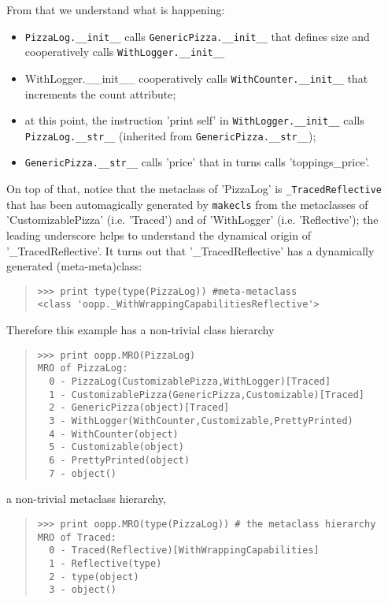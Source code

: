 \documentclass[10pt,english]{article}
\begin{document}
From that we understand what is happening:
\begin{itemize}
\item {} 
\texttt{PizzaLog.{\_}{\_}init{\_}{\_}} calls \texttt{GenericPizza.{\_}{\_}init{\_}{\_}} that defines size and
cooperatively calls \texttt{WithLogger.{\_}{\_}init{\_}{\_}}

\item {} 
WithLogger.{\_}{\_}init{\_}{\_} cooperatively calls \texttt{WithCounter.{\_}{\_}init{\_}{\_}} 
that increments the count attribute;

\item {} 
at this point, the instruction 'print self' in \texttt{WithLogger.{\_}{\_}init{\_}{\_}} calls 
\texttt{PizzaLog.{\_}{\_}str{\_}{\_}} (inherited from \texttt{GenericPizza.{\_}{\_}str{\_}{\_}});

\item {} 
\texttt{GenericPizza.{\_}{\_}str{\_}{\_}} calls 'price' that in turns calls 
'toppings{\_}price'.

\end{itemize}

On top of that, notice that the metaclass of 'PizzaLog' is
\texttt{{\_}TracedReflective} that has been automagically generated by 
\texttt{makecls} from the metaclasses of 'CustomizablePizza' (i.e. 'Traced')
and of 'WithLogger' (i.e. 'Reflective'); the leading underscore helps 
to understand the dynamical origin of '{\_}TracedReflective'.
It turns out that '{\_}TracedReflective' has a dynamically
generated (meta-meta)class:
\begin{quote}
\begin{verbatim}>>> print type(type(PizzaLog)) #meta-metaclass
<class 'oopp._WithWrappingCapabilitiesReflective'>\end{verbatim}
\end{quote}

Therefore this example has a non-trivial class hierarchy
\begin{quote}
\begin{verbatim}>>> print oopp.MRO(PizzaLog)
MRO of PizzaLog:
  0 - PizzaLog(CustomizablePizza,WithLogger)[Traced]
  1 - CustomizablePizza(GenericPizza,Customizable)[Traced]
  2 - GenericPizza(object)[Traced]
  3 - WithLogger(WithCounter,Customizable,PrettyPrinted)
  4 - WithCounter(object)
  5 - Customizable(object)
  6 - PrettyPrinted(object)
  7 - object()\end{verbatim}
\end{quote}

a non-trivial metaclass hierarchy,
\begin{quote}
\begin{verbatim}>>> print oopp.MRO(type(PizzaLog)) # the metaclass hierarchy
MRO of Traced:
  0 - Traced(Reflective)[WithWrappingCapabilities]
  1 - Reflective(type)
  2 - type(object)
  3 - object()\end{verbatim}
\end{quote}
\end{document}
